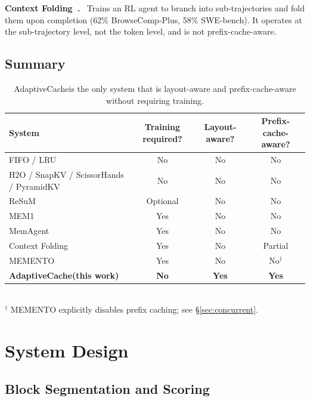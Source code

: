 \documentclass[letterpaper,twocolumn,10pt]{article}
\newcommand{\sysname}{AdaptiveCache}
\newcommand{\para}[1]{\smallskip\noindent\textbf{#1.}\ }
\begin{document}
\para{Context Folding~\cite{sun2025contextfolding}} Trains an RL agent to
branch into sub-trajectories and fold them upon completion (62\%
BrowseComp-Plus, 58\% SWE-bench). It operates at the sub-trajectory level,
not the token level, and is not prefix-cache-aware.

\subsection{Summary}

\begin{table}[t]
\centering\small
\setlength{\tabcolsep}{8pt}
\begin{tabular}{lccc}
\toprule
\textbf{System} & \textbf{Training required?} & \textbf{Layout-aware?} & \textbf{Prefix-cache-aware?} \\
\midrule
FIFO / LRU                              & No       & No  & No \\
H2O / SnapKV / ScissorHands / PyramidKV & No       & No  & No \\
ReSuM~\cite{wu2025resum}                & Optional & No  & No \\
MEM1~\cite{zhou2025mem1}                & Yes      & No  & No \\
MemAgent~\cite{yu2025memagent}          & Yes      & No  & No \\
Context Folding~\cite{sun2025contextfolding} & Yes  & No  & Partial \\
MEMENTO~\cite{kontonis2026memento}      & Yes      & No  & No$^\dagger$ \\
\midrule
\textbf{\sysname (this work)}           & \textbf{No} & \textbf{Yes} & \textbf{Yes} \\
\bottomrule
\end{tabular}
\\[4pt]
\small{$^\dagger$ MEMENTO explicitly disables prefix caching; see \S\ref{sec:concurrent}.}
\caption{\sysname is the only system that is layout-aware and prefix-cache-aware without requiring training.}
\label{tab:comparison}
\end{table}

\section{System Design}

\subsection{Block Segmentation and Scoring}
\end{document}
